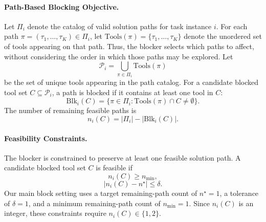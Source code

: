 \paragraph{Path-Based Blocking Objective.}
Let $\Pi_i$ denote the catalog of valid solution paths for task instance $i$.
For each path $\pi=(\tau_1,\ldots,\tau_K)\in\Pi_i$, let $\mathrm{Tools}(\pi)=\{\tau_1,\ldots,\tau_K\}$ denote the unordered set of tools appearing on that path.
Thus, the blocker selects which paths to affect, without considering the order in which those paths may be explored.
Let
\begin{equation}
\mathcal{P}_i = \bigcup_{\pi \in \Pi_i} \mathrm{Tools}(\pi)
\end{equation}
be the set of unique tools appearing in the path catalog.
For a candidate blocked tool set $C \subseteq \mathcal{P}_i$, a path is blocked if it contains at least one tool in $C$:
\begin{equation}
\mathrm{Blk}_i(C)
=
\{\pi \in \Pi_i : \mathrm{Tools}(\pi) \cap C \neq \emptyset\}.
\end{equation}
The number of remaining feasible paths is
\begin{equation}
n_i(C)
=
|\Pi_i| - |\mathrm{Blk}_i(C)|.
\end{equation}

\paragraph{Feasibility Constraints.}
The blocker is constrained to preserve at least one feasible solution path.
A candidate blocked tool set $C$ is feasible if
\begin{equation}
n_i(C)\geq n_{\min},
\end{equation}
\begin{equation}
|n_i(C)-n^\star|\leq\delta.
\end{equation}
Our main block setting uses a target remaining-path count of $n^\star=1$, a tolerance of $\delta=1$, and a minimum remaining-path count of $n_{\min}=1$.
Since $n_i(C)$ is an integer, these constraints require $n_i(C)\in\{1,2\}$.

